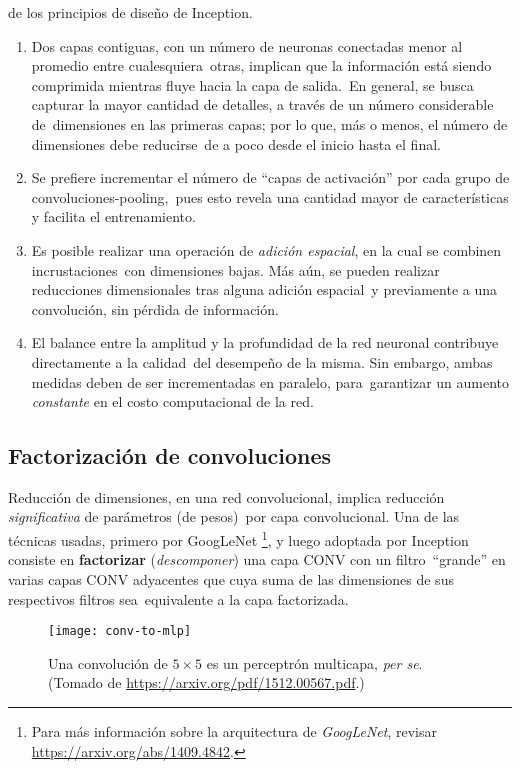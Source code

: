 de los principios de diseño de Inception.
\begin{enumerate}[label=\textbf{S.\arabic*}]
\item Dos capas contiguas, con un número de neuronas conectadas menor al promedio entre cualesquiera\
  otras, implican que la información está siendo comprimida mientras fluye hacia la capa de salida.\
  En general, se busca capturar la mayor cantidad de detalles, a través de un número considerable de\
  dimensiones en las primeras capas; por lo que, más o menos, el número de dimensiones debe reducirse\
  de a poco desde el inicio hasta el final.
\item Se prefiere incrementar el número de ``capas de activación'' por cada grupo de convoluciones-pooling,\
  pues esto revela una cantidad mayor de características y facilita el entrenamiento.
\item \label{sp-agg} Es posible realizar una operación de \emph{adición espacial}, en la cual se combinen incrustaciones\
  con dimensiones bajas. Más aún, se pueden realizar reducciones dimensionales tras alguna adición espacial\
  y previamente a una convolución, sin pérdida de información.
\item El balance entre la amplitud y la profundidad de la red neuronal contribuye directamente a la calidad\
  del desempeño de la misma. Sin embargo, ambas medidas deben de ser incrementadas en paralelo, para\
  garantizar un aumento \emph{constante} en el costo computacional de la red.
\end{enumerate}

\subsection{Factorización de convoluciones}

Reducción de dimensiones, en una red convolucional, implica reducción \emph{significativa} de parámetros (de pesos)\
por capa convolucional. Una de las técnicas usadas, primero por GoogLeNet
\footnote{
  Para más información sobre la arquitectura de \emph{GoogLeNet}, revisar \url{https://arxiv.org/abs/1409.4842}.
},
y luego adoptada por Inception consiste en \textbf{factorizar} (\emph{descomponer}) una capa CONV con un filtro\
``grande'' en varias capas CONV adyacentes que cuya suma de las dimensiones de sus respectivos filtros sea\
equivalente a la capa factorizada.\par

\begin{figure}[H]
  \centering
  \texttt{[image: conv-to-mlp]}
  \caption{Una convolución de $5 \times 5$ es un perceptrón multicapa, \emph{per se}.
    (Tomado de \url{https://arxiv.org/pdf/1512.00567.pdf}.)}
  \label{conv-to-mlp}
\end{figure}

